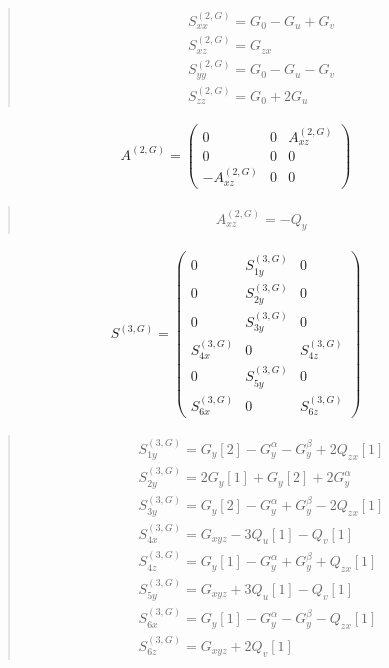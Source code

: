 \documentclass[fleqn,10pt]{jsarticle}
\begin{document}
\begin{quote}
\begin{align*}
& S^{(2,G)}_{xx} = G_{0} - G_{u} + G_{v} \\
& S^{(2,G)}_{xz} = G_{zx} \\
& S^{(2,G)}_{yy} = G_{0} - G_{u} - G_{v} \\
& S^{(2,G)}_{zz} = G_{0} + 2 G_{u}
\end{align*}
\end{quote}
\begin{align*}
A^{(2,G)} = \begin{pmatrix} 0 & 0 & A^{(2,G)}_{xz} \\ 0 & 0 & 0 \\ - A^{(2,G)}_{xz} & 0 & 0 \end{pmatrix}
\end{align*}
\begin{quote}
\begin{align*}
& A^{(2,G)}_{xz} = - Q_{y}
\end{align*}
\end{quote}
\begin{align*}
S^{(3,G)} = \begin{pmatrix} 0 & S^{(3,G)}_{1y} & 0 \\ 0 & S^{(3,G)}_{2y} & 0 \\ 0 & S^{(3,G)}_{3y} & 0 \\ S^{(3,G)}_{4x} & 0 & S^{(3,G)}_{4z} \\ 0 & S^{(3,G)}_{5y} & 0 \\ S^{(3,G)}_{6x} & 0 & S^{(3,G)}_{6z} \end{pmatrix}
\end{align*}
\begin{quote}
\begin{align*}
& S^{(3,G)}_{1y} = G_{y}[2] - G_{y}^{\alpha} - G_{y}^{\beta} + 2 Q_{zx}[1] \\
& S^{(3,G)}_{2y} = 2 G_{y}[1] + G_{y}[2] + 2 G_{y}^{\alpha} \\
& S^{(3,G)}_{3y} = G_{y}[2] - G_{y}^{\alpha} + G_{y}^{\beta} - 2 Q_{zx}[1] \\
& S^{(3,G)}_{4x} = G_{xyz} - 3 Q_{u}[1] - Q_{v}[1] \\
& S^{(3,G)}_{4z} = G_{y}[1] - G_{y}^{\alpha} + G_{y}^{\beta} + Q_{zx}[1] \\
& S^{(3,G)}_{5y} = G_{xyz} + 3 Q_{u}[1] - Q_{v}[1] \\
& S^{(3,G)}_{6x} = G_{y}[1] - G_{y}^{\alpha} - G_{y}^{\beta} - Q_{zx}[1] \\
& S^{(3,G)}_{6z} = G_{xyz} + 2 Q_{v}[1]
\end{align*}
\end{quote}
\end{document}

